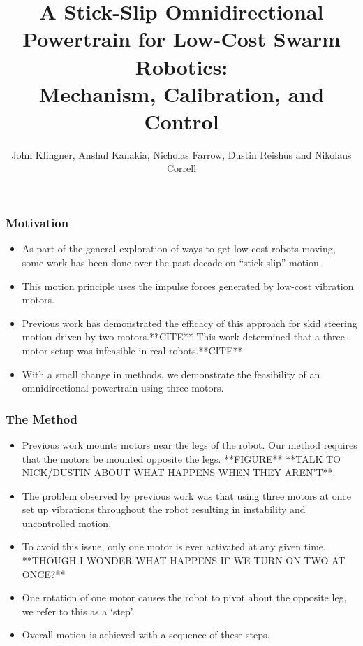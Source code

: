 \documentclass{beamer}
\title[\textcolor{black}{Low-Cost Omnidirectional Powertrain}]{A Stick-Slip Omnidirectional Powertrain for Low-Cost Swarm Robotics:\\ Mechanism, Calibration, and Control}
\author[{\tt john.klingner@colorado.edu}]{John Klingner, Anshul Kanakia, Nicholas Farrow, Dustin Reishus and Nikolaus Correll}
\institute[]{Department of Computer Science\\University of Colorado Boulder}
\date{}
\begin{document}
\begin{frame}
	\titlepage
\end{frame}
\begin{frame}
	\frametitle{Motivation}
	\begin{itemize}
		\item As part of the general exploration of ways to get low-cost robots moving, some work has been done over the past decade on ``stick-slip'' motion.
		\item This motion principle uses the impulse forces generated by low-cost vibration motors.
		\item Previous work has demonstrated the efficacy of this approach for skid steering motion driven by two motors.**CITE** This work determined that a three-motor setup was infeasible in real robots.**CITE**
		\item With a small change in methods, we demonstrate the feasibility of an omnidirectional powertrain using three motors.
	\end{itemize}
\end{frame}
\begin{frame}
	\frametitle{The Method}
	\begin{itemize}
		\item Previous work mounts motors near the legs of the robot. Our method requires that the motors be mounted opposite the legs. **FIGURE** **TALK TO NICK/DUSTIN ABOUT WHAT HAPPENS WHEN THEY AREN'T**.
		\item The problem observed by previous work was that using three motors at once set up vibrations throughout the robot resulting in instability and uncontrolled motion.	
		\item To avoid this issue, only one motor is ever activated at any given time. **THOUGH I WONDER WHAT HAPPENS IF WE TURN ON TWO AT ONCE?**
		\item One rotation of one motor causes the robot to pivot about the opposite leg, we refer to this as a `step'.
		\item Overall motion is achieved with a sequence of these steps.
	\end{itemize}
\end{frame}
\end{document}
